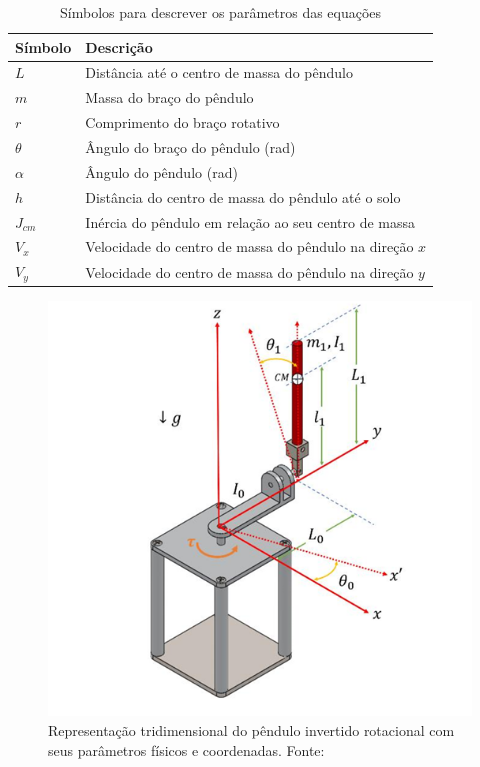 \documentclass[9pt,a4paper,twocolumn,twoside]{tau-class/tau}
\begin{document}
    \begin{table}[H]
    \centering
    \caption{Símbolos para descrever os parâmetros das equações}
    \begin{tabular}{ll}
        \toprule
        \textbf{Símbolo} & \textbf{Descrição} \\
        \midrule
        $L$   & Distância até o centro de massa do pêndulo \\
        $m$   & Massa do braço do pêndulo \\
        $r$   & Comprimento do braço rotativo \\
        $\theta$ & Ângulo do braço do pêndulo (rad) \\
        $\alpha$ & Ângulo do pêndulo (rad) \\
        $h$   & Distância do centro de massa do pêndulo até o solo \\
        $J_{cm}$ & Inércia do pêndulo em relação ao seu centro de massa \\
        $V_{x}$  & Velocidade do centro de massa do pêndulo na direção $x$ \\
        $V_{y}$  & Velocidade do centro de massa do pêndulo na direção $y$ \\
        \bottomrule
    \end{tabular}
\end{table}


\begin{figure}[H]
        \centering
        \includegraphics[width=0.85\columnwidth]{figures/pendulo com angulos.png}
        \caption{Representação tridimensional do pêndulo invertido rotacional com seus parâmetros físicos e coordenadas. Fonte: \cite{Duart2017}}
        \label{fig:esquema}
\end{figure} 
\end{document}

